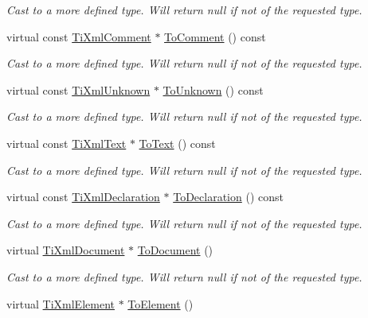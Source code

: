 \begin{DoxyCompactItemize}
\begin{DoxyCompactList}\small\item\em Cast to a more defined type. Will return null if not of the requested type. \end{DoxyCompactList}\item 
virtual const \hyperlink{class_ti_xml_comment}{Ti\+Xml\+Comment} $\ast$ \hyperlink{class_ti_xml_node_a5ad43b9d545315e9bb4f50d4cb70de9e}{To\+Comment} () const
\begin{DoxyCompactList}\small\item\em Cast to a more defined type. Will return null if not of the requested type. \end{DoxyCompactList}\item 
virtual const \hyperlink{class_ti_xml_unknown}{Ti\+Xml\+Unknown} $\ast$ \hyperlink{class_ti_xml_node_ab4f2e6ce87d36c1b9b7de2529128a460}{To\+Unknown} () const
\begin{DoxyCompactList}\small\item\em Cast to a more defined type. Will return null if not of the requested type. \end{DoxyCompactList}\item 
virtual const \hyperlink{class_ti_xml_text}{Ti\+Xml\+Text} $\ast$ \hyperlink{class_ti_xml_node_a2591700660b308571c09166559a39332}{To\+Text} () const
\begin{DoxyCompactList}\small\item\em Cast to a more defined type. Will return null if not of the requested type. \end{DoxyCompactList}\item 
virtual const \hyperlink{class_ti_xml_declaration}{Ti\+Xml\+Declaration} $\ast$ \hyperlink{class_ti_xml_node_a0dc0831e89d499ca911a3be61a413d45}{To\+Declaration} () const
\begin{DoxyCompactList}\small\item\em Cast to a more defined type. Will return null if not of the requested type. \end{DoxyCompactList}\item 
virtual \hyperlink{class_ti_xml_document}{Ti\+Xml\+Document} $\ast$ \hyperlink{class_ti_xml_node_a6a4c8ac28ee7a745d059db6691e03bae}{To\+Document} ()
\begin{DoxyCompactList}\small\item\em Cast to a more defined type. Will return null if not of the requested type. \end{DoxyCompactList}\item 
virtual \hyperlink{class_ti_xml_element}{Ti\+Xml\+Element} $\ast$ \hyperlink{class_ti_xml_node_aa65d000223187d22a4dcebd7479e9ebc}{To\+Element} ()

\end{DoxyCompactItemize}
